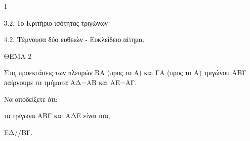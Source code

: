 \begin{ylh}{1}
    \item 3.2. 1ο Κριτήριο ισότητας τριγώνων
    \item 4.2. Τέμνουσα δύο ευθειών - Ευκλείδειο αίτημα.
\end{ylh}

ΘΕΜΑ 2

Στις προεκτάσεις των πλευρών ΒΑ (προς το Α) και ΓΑ (προς το Α) τριγώνου ΑΒΓ παίρνουμε τα τμήματα ΑΔ=ΑΒ και ΑΕ=ΑΓ.

Να αποδείξετε ότι:

\begin{alist}
\item τα τρίγωνα ΑΒΓ και ΑΔΕ είναι ίσα, 

\item ΕΔ//ΒΓ. 
\end{alist}
